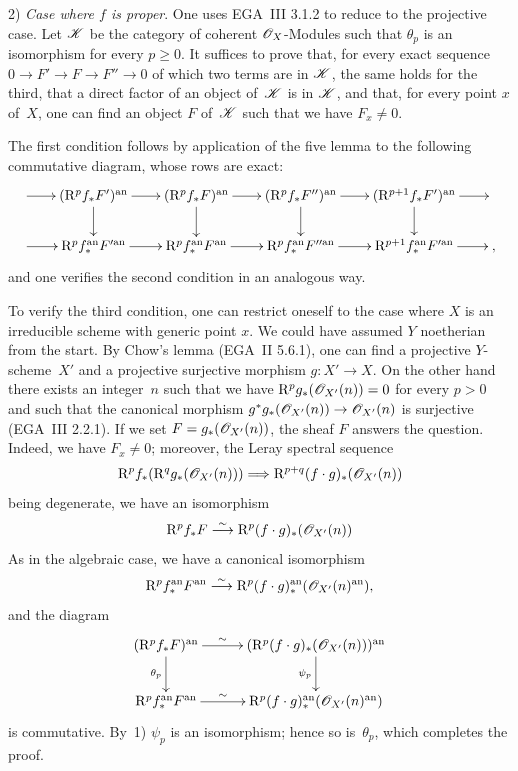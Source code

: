 2)
\emph{Case where $f$ is proper}. One uses EGA~III 3.1.2 to
reduce to the projective case. Let $\cal{K}$ be the category of
coherent $\cal{O}_X$-Modules such that $\theta_p$ is an
isomorphism for every $p \geq 0$. It suffices to prove that, for
every exact sequence $0 \to F' \to F \to F'' \to 0$
of which two terms are in $\cal{K}$, the same holds for the
third, that a direct factor of an object of~$\cal{K}$ is in
$\cal{K}$, and that, for every point $x$ of~$X$, one can find an
object $F$ of~$\cal{K}$ such that we have $F_x \neq 0$.

The first condition follows by application of the five
lemma to the following commutative diagram, whose rows are exact:
$$
\xymatrix@=.7cm{ \ar[r] & (\R^p f_* F')^\an \ar[d] \ar[r] &(\R^p f_*
F)^\an \ar[d] \ar[r] & (\R^p f_* F'')^\an \ar[d] \ar[r] &
(\R^{p+1} f_* F' )^\an \ar[r] \ar[d] &\, \\ \ar[r] & \R^p
f_*^\an F'^\an \ar[r] &\R^p f_*^\an F^\an \ar[r] & \R^p
f_*^\an F''^\an \ar[r] & \R^{p+1} f_*^\an F'^\an \ar[r] &
\quoi,}
$$
and one verifies the second condition in an analogous way.

To verify the third condition, one can restrict oneself to the case
where $X$ is an irreducible scheme with generic
point $x$. We could have assumed $Y$ noetherian from
the start. By Chow's lemma (EGA~II 5.6.1), one can
find a projective $Y$-scheme~$X'$ and a projective
surjective morphism $g \colon X' \to X$. On the other hand there exists an integer~$n$
such that we have $\R^p g_* (\cal{O}_{X'} (n)) = 0 $ for every $p>0$ and
such that the canonical morphism $g^* g_* (\cal{O}_{X'} (n)) \to
\cal{O}_{X'} (n)$ is surjective (EGA~III 2.2.1). If we set
$F = g_* (\cal{O}_{X'} (n)) $, the sheaf $F$ answers
the question. Indeed, we have $F_x \neq 0$; moreover, the Leray
spectral sequence
$$
\R^p f_* (\R^q g_* (\cal{O}_{X'} (n))) \To \R^{p+q}
(f\cdot g)_* (\cal{O}_{X'} (n))
$$
being degenerate, we have an isomorphism
$$
\R^p f_* F \isomto \R^p (f\cdot g)_* (\cal{O}_{X'} (n))
$$
As in the algebraic case, we have a canonical isomorphism
$$\R^p f_*^\an F^\an \isomto
\R^p (f\cdot g)_*^\an (\cal{O}_{X'}(n)^\an ),$$
and the diagram
$$
\xymatrix@C=1cm{
(\R^p f_* F)^\an \ar[d]_{\theta_p} \ar[r]^-{\sim} & (\R^p (f\cdot g)_* (\cal{O}_{X'} (n)))^\an \ar[d]_{\psi_p} \\
\R^p f_*^\an F^\an \ar[r]^-{\sim} & \R^p (f\cdot g)_*^\an
(\cal{O}_{X'}(n)^\an)}
$$
is commutative. By~1) $\psi_p $ is an isomorphism; hence so
is~$\theta_p$, which completes the
proof.

